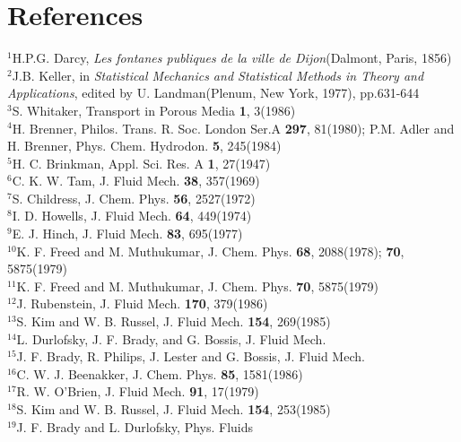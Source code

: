 \documentclass[12pt]{article}
\begin{document}
\section{References}
$^1$H.P.G. Darcy, \textit{Les fontanes publiques de la ville de Dijon}(Dalmont, Paris, 1856)\\
$^2$J.B. Keller, in \textit{Statistical Mechanics and Statistical Methods in Theory and Applications}, 
edited by U. Landman(Plenum, New York, 1977), pp.631-644\\
$^3$S. Whitaker, Transport in Porous Media \textbf{1}, 3(1986)\\
$^4$H. Brenner, Philos. Trans. R. Soc. London Ser.A \textbf{297}, 81(1980); P.M. Adler and H. Brenner, Phys. Chem. Hydrodon. \textbf{5}, 245(1984)\\
$^5$H. C. Brinkman, Appl. Sci. Res. A \textbf{1}, 27(1947)\\
$^6$C. K. W. Tam, J. Fluid Mech. \textbf{38}, 357(1969)\\
$^7$S. Childress, J. Chem. Phys. \textbf{56}, 2527(1972)\\
$^8$I. D. Howells, J. Fluid Mech. \textbf{64}, 449(1974)\\
$^9$E. J. Hinch, J. Fluid Mech. \textbf{83}, 695(1977)\\
$^{10}$K. F. Freed and M. Muthukumar, J. Chem. Phys. \textbf{68}, 2088(1978); \textbf{70}, 5875(1979)\\
$^{11}$K. F. Freed and M. Muthukumar, J. Chem. Phys. \textbf{70}, 5875(1979)\\
$^{12}$J. Rubenstein, J. Fluid Mech. \textbf{170}, 379(1986)\\
$^{13}$S. Kim and W. B. Russel, J. Fluid Mech. \textbf{154}, 269(1985)\\
$^{14}$L. Durlofsky, J. F. Brady, and G. Bossis, J. Fluid Mech.\\
$^{15}$J. F. Brady, R. Philips, J. Lester and G. Bossis, J. Fluid Mech.\\
$^{16}$C. W. J. Beenakker, J. Chem. Phys. \textbf{85}, 1581(1986)\\
$^{17}$R. W. O'Brien, J. Fluid Mech. \textbf{91}, 17(1979)\\
$^{18}$S. Kim and W. B. Russel, J. Fluid Mech. \textbf{154}, 253(1985)\\
$^{19}$J. F. Brady and L. Durlofsky, Phys. Fluids\\
\end{document}
